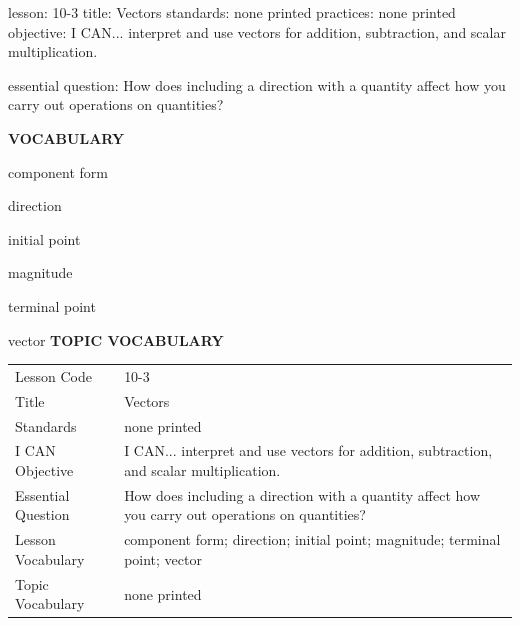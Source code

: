\documentclass{article}
\newenvironment{lesson-meta}{}{}        %
\newcommand{\te}[1]{}                   %
\begin{document}
\begin{lesson-meta}
lesson: 10-3
title: Vectors
standards: none printed
practices: none printed
objective: I CAN... interpret and use vectors for addition, subtraction, and scalar multiplication.

essential question: How does including a direction with a quantity affect how you carry out operations on quantities?

\textbf{VOCABULARY}
\item component form
\item direction
\item initial point
\item magnitude
\item terminal point
\item vector
\textbf{TOPIC VOCABULARY}
\te{No separate topic vocabulary list is printed on these lesson pages.}
\begin{tabular}{ll}
Lesson Code & 10-3 \\
Title & Vectors \\
Standards & none printed \\
I CAN Objective & I CAN... interpret and use vectors for addition, subtraction, and scalar multiplication. \\
Essential Question & How does including a direction with a quantity affect how you carry out operations on quantities? \\
Lesson Vocabulary & component form; direction; initial point; magnitude; terminal point; vector \\
Topic Vocabulary & none printed \\
\end{tabular}
\end{lesson-meta}
\end{document}
